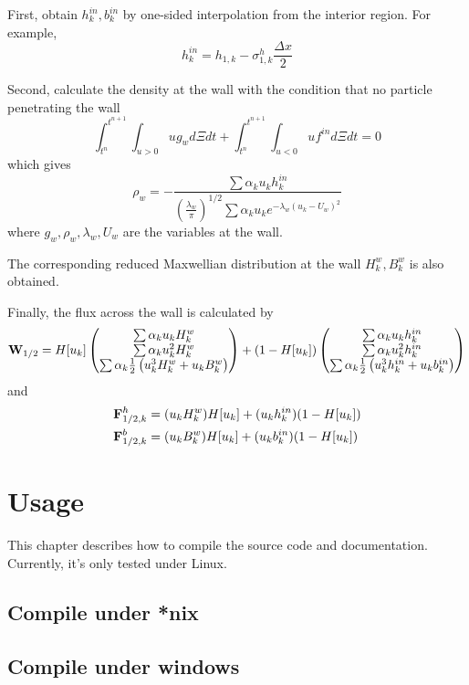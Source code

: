 \documentclass[a4paper]{book}
\begin{document}
First, obtain $h_k^{in},b_k^{in}$ by one-sided interpolation from the interior region. For example,
$$h_{k}^{in} = h_{1,k}-\sigma_{1,k}^h\frac{\Delta x}{2}$$

Second, calculate the density at the wall with the condition that no particle penetrating the wall
$$\int_{t^n}^{t^{n+1}}\int_{u>0} ug_w d\Xi dt+\int_{t^n}^{t^{n+1}}\int_{u<0} uf^{in}d\Xi dt=0$$
which gives
$$\rho_w = -\frac{\sum\alpha_k u_k h_k^{in}}{\left(\frac{\lambda_w}{\pi}\right)^{1/2}\sum\alpha_k u_k e^{-\lambda_w(u_k-U_w)^2}}$$
where $g_w,\rho_w,\lambda_w,U_w$ are the variables at the wall.

The corresponding reduced Maxwellian distribution at the wall $H_k^w,B_k^w$ is also obtained.

Finally, the flux across the wall is calculated by
$$
{\bf W}_{1/2} = H[u_k]
\begin{pmatrix}
    \sum\alpha_k u_k H_k^{w}\\
    \sum\alpha_k u_k^2 H_k^{w}\\
    \sum\alpha_k \frac{1}{2}\left(u_k^3 H_k^{w}+u_k B_k^{w}\right)
\end{pmatrix} 
+(1-H[u_k])
\begin{pmatrix}
    \sum\alpha_k u_k h_k^{in}\\
    \sum\alpha_k u_k^2 h_k^{in}\\
    \sum\alpha_k \frac{1}{2}\left(u_k^3 h_k^{in}+u_k b_k^{in}\right)
\end{pmatrix} 
$$
and
$$
\begin{aligned}
    {\bf F}_{1/2,k}^h &= (u_k H_k^{w})H[u_k]+(u_k h_k^{in})(1-H[u_k]) \\
    {\bf F}_{1/2,k}^b &= (u_k B_k^{w})H[u_k]+(u_k b_k^{in})(1-H[u_k]) \\
\end{aligned} 
$$

\chapter{Usage}
This chapter describes how to compile the source code and documentation.
Currently, it's only tested under Linux.
\section{Compile under *nix}
\section{Compile under windows}
\end{document}
